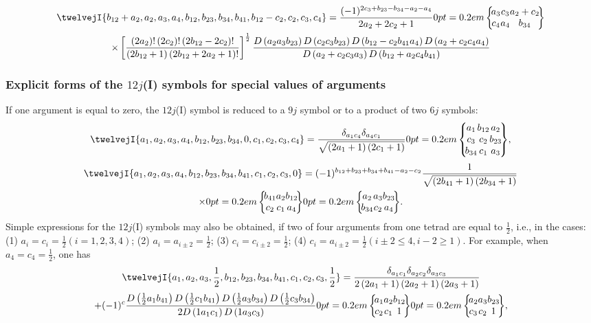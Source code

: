 \begin{gather}
\twelvejI{b_{12}+a_{2},a_{2},a_{3},a_{4},b_{12},b_{23},b_{34},b_{41},b_{12}-c_{2},c_{2},c_{3},c_{4}}=\frac{(-1)^{2 c_{3}+b_{23}-b_{34}-a_{2}-a_{4}}}{2 a_{2}+2 c_{2}+1}\sixj{a_{3}}{c_{3}}{a_{2}+c_{2}}{c_{4}}{a_{4}}{b_{34}}  \notag\\
\times\left[\frac{\left(2 a_{2}\right)!\left(2 c_{2}\right)!\left(2 b_{12}-2 c_{2}\right)!}{\left(2 b_{12}+1\right)\left(2 b_{12}+2 a_{2}+1\right)!}\right]^{\frac{1}{2}} \frac{D\left(a_{2} a_{3} b_{23}\right) D\left(c_{2} c_{3} b_{23}\right) D\left(b_{12}-c_{2} b_{41} a_{4}\right) D\left(a_{2}+c_{2} c_{4} a_{4}\right)}{D\left(a_{2}+c_{2} c_{3} a_{3}\right) D\left(b_{12}+a_{2} c_{4} b_{41}\right)} \label{eq:10:13:16}
\end{gather}

\subsubsection{Explicit forms of the $12j$(I) symbols for special values of arguments}
If one argument is equal to zero, the $12j$(I) symbol is reduced to a $9 j$ symbol or to a product of two $6 j$ symbols:
\begin{gather}
\twelvejI{a_{1},a_{2},a_{3},a_{4},b_{12},b_{23},b_{34},0,c_{1},c_{2},c_{3},c_{4}}=\frac{\delta_{a_{1} c_{4}} \delta_{a_{4} c_{1}}}{\sqrt{\left(2 a_{1}+1\right)\left(2 c_{1}+1\right)}}\ninej{a_{1}}{b_{12}}{a_{2}}{c_{3}}{c_{2}}{b_{23}}{b_{34}}{c_{1}}{a_{3}},  \label{eq:10:13:17}
\end{gather}
\begin{gather}
\twelvejI{a_{1},a_{2},a_{3},a_{4},b_{12},b_{23},b_{34},b_{41},c_{1},c_{2},c_{3},0}=(-1)^{b_{12}+b_{23}+b_{34}+b_{41}-a_{2}-c_{2}} \frac{1}{\sqrt{\left(2 b_{41}+1\right)\left(2 b_{34}+1\right)}}  \notag\\
\times\sixj{b_{41}}{a_{2}}{b_{12}}{c_{2}}{c_{1}}{a_{4}}\sixj{a_{2}}{a_{3}}{b_{23}}{b_{34}}{c_{2}}{a_{4}} . \label{eq:10:13:18}
\end{gather}
Simple expressions for the $12j$(I) symbols may also be obtained, if two of four arguments from one tetrad are equal to $\frac{1}{2}$, i.e., in the cases: (1) $a_{i}=c_{i}=\frac{1}{2}(i=1,2,3,4)$; (2) $a_{i}=a_{i \pm 2}=\frac{1}{2}$; (3) $c_{i}=c_{i \pm 2}=\frac{1}{2}$; (4) $c_{i}=a_{i \pm 2}=\frac{1}{2}(i \pm 2 \leq 4, i-2 \geq 1)$. For example, when $a_{4}=c_{4}=\frac{1}{2}$, one has
\begin{gather}
\twelvejI{a_{1},a_{2},a_{3},\frac{1}{2},b_{12},b_{23},b_{34},b_{41},c_{1},c_{2},c_{3},\frac{1}{2}}=\frac{\delta_{a_{1} c_{1}} \delta_{a_{2} c_{2}} \delta_{a_{3} c_{3}}}{2\left(2 a_{1}+1\right)\left(2 a_{2}+1\right)\left(2 a_{3}+1\right)}  \notag\\
+(-1)^{c} \frac{D\left(\frac{1}{2} a_{1} b_{41}\right) D\left(\frac{1}{2} c_{1} b_{41}\right) D\left(\frac{1}{2} a_{3} b_{34}\right) D\left(\frac{1}{2} c_{3} b_{34}\right)}{2 D\left(1 a_{1} c_{1}\right) D\left(1 a_{3} c_{3}\right)}\sixj{a_{1}}{a_{2}}{b_{12}}{c_{2}}{c_{1}}{1}\sixj{a_{2}}{a_{3}}{b_{23}}{c_{3}}{c_{2}}{1}, \label{eq:10:13:19}
\end{gather}
